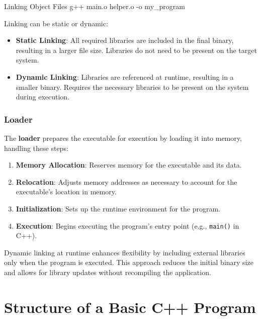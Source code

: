     \begin{codeblock}[language=bash]{Linking Object Files}
    g++ main.o helper.o -o my_program
    \end{codeblock}
    
    Linking can be static or dynamic:
    \begin{itemize}
        \item \textbf{Static Linking}: All required libraries are included in the final binary, resulting in a larger file size. Libraries do not need to be present on the target system.
        \item \textbf{Dynamic Linking}: Libraries are referenced at runtime, resulting in a smaller binary. Requires the necessary libraries to be present on the system during execution.
    \end{itemize}

\subsubsection{Loader}
    
    The \textbf{loader} prepares the executable for execution by loading it into memory, handling these steps:
    \begin{enumerate}
        \item \textbf{Memory Allocation}: Reserves memory for the executable and its data.
        \item \textbf{Relocation}: Adjusts memory addresses as necessary to account for the executable's location in memory.
        \item \textbf{Initialization}: Sets up the runtime environment for the program.
        \item \textbf{Execution}: Begins executing the program's entry point (e.g., \texttt{main()} in C++).
    \end{enumerate}
    
    \begin{observationblock}
        Dynamic linking at runtime enhances flexibility by including external libraries only when the program is executed. This approach reduces the initial binary size and allows for library updates without recompiling the application.
    \end{observationblock}

\section{Structure of a Basic C++ Program}

